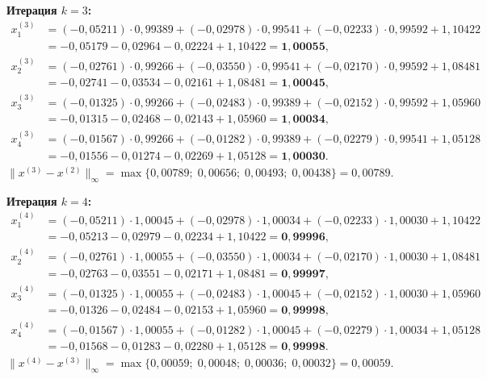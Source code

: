 \documentclass[a4paper, final]{article}
\begin{document}
\medskip\textbf{Итерация $k=3$:}
\begin{align*}
x_1^{(3)} &= (-0{,}05211)\cdot0{,}99389 + (-0{,}02978)\cdot0{,}99541 + (-0{,}02233)\cdot0{,}99592 + 1{,}10422\\
           &= -0{,}05179 - 0{,}02964 - 0{,}02224 + 1{,}10422 = \mathbf{1{,}00055},\\
x_2^{(3)} &= (-0{,}02761)\cdot0{,}99266 + (-0{,}03550)\cdot0{,}99541 + (-0{,}02170)\cdot0{,}99592 + 1{,}08481\\
           &= -0{,}02741 - 0{,}03534 - 0{,}02161 + 1{,}08481 = \mathbf{1{,}00045},\\
x_3^{(3)} &= (-0{,}01325)\cdot0{,}99266 + (-0{,}02483)\cdot0{,}99389 + (-0{,}02152)\cdot0{,}99592 + 1{,}05960\\
           &= -0{,}01315 - 0{,}02468 - 0{,}02143 + 1{,}05960 = \mathbf{1{,}00034},\\
x_4^{(3)} &= (-0{,}01567)\cdot0{,}99266 + (-0{,}01282)\cdot0{,}99389 + (-0{,}02279)\cdot0{,}99541 + 1{,}05128\\
           &= -0{,}01556 - 0{,}01274 - 0{,}02269 + 1{,}05128 = \mathbf{1{,}00030}.
\end{align*}
$\|x^{(3)}-x^{(2)}\|_\infty = \max\{0{,}00789;\;0{,}00656;\;0{,}00493;\;0{,}00438\} = 0{,}00789.$

\medskip\textbf{Итерация $k=4$:}
\begin{align*}
x_1^{(4)} &= (-0{,}05211)\cdot1{,}00045 + (-0{,}02978)\cdot1{,}00034 + (-0{,}02233)\cdot1{,}00030 + 1{,}10422\\
           &= -0{,}05213 - 0{,}02979 - 0{,}02234 + 1{,}10422 = \mathbf{0{,}99996},\\
x_2^{(4)} &= (-0{,}02761)\cdot1{,}00055 + (-0{,}03550)\cdot1{,}00034 + (-0{,}02170)\cdot1{,}00030 + 1{,}08481\\
           &= -0{,}02763 - 0{,}03551 - 0{,}02171 + 1{,}08481 = \mathbf{0{,}99997},\\
x_3^{(4)} &= (-0{,}01325)\cdot1{,}00055 + (-0{,}02483)\cdot1{,}00045 + (-0{,}02152)\cdot1{,}00030 + 1{,}05960\\
           &= -0{,}01326 - 0{,}02484 - 0{,}02153 + 1{,}05960 = \mathbf{0{,}99998},\\
x_4^{(4)} &= (-0{,}01567)\cdot1{,}00055 + (-0{,}01282)\cdot1{,}00045 + (-0{,}02279)\cdot1{,}00034 + 1{,}05128\\
           &= -0{,}01568 - 0{,}01283 - 0{,}02280 + 1{,}05128 = \mathbf{0{,}99998}.
\end{align*}
$\|x^{(4)}-x^{(3)}\|_\infty = \max\{0{,}00059;\;0{,}00048;\;0{,}00036;\;0{,}00032\} = 0{,}00059.$
\end{document}
